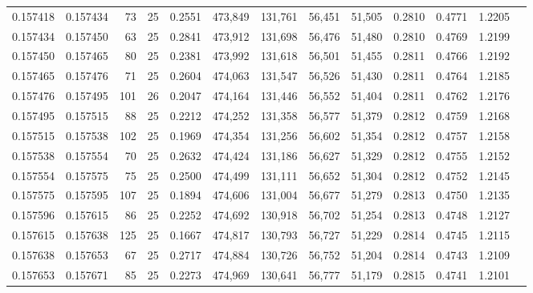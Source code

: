 \begin{tabular}{rrrrrrrrrrrrr}
0.157418 & 0.157434 &    73 &  25 &                                     0.2551 & 473,849 & 131,761 &  56,451 &  51,505 & 0.2810 & 0.4771 & 1.2205 \\
0.157434 & 0.157450 &    63 &  25 &                                     0.2841 & 473,912 & 131,698 &  56,476 &  51,480 & 0.2810 & 0.4769 & 1.2199 \\
0.157450 & 0.157465 &    80 &  25 &                                     0.2381 & 473,992 & 131,618 &  56,501 &  51,455 & 0.2811 & 0.4766 & 1.2192 \\
0.157465 & 0.157476 &    71 &  25 &                                     0.2604 & 474,063 & 131,547 &  56,526 &  51,430 & 0.2811 & 0.4764 & 1.2185 \\
0.157476 & 0.157495 &   101 &  26 &                                     0.2047 & 474,164 & 131,446 &  56,552 &  51,404 & 0.2811 & 0.4762 & 1.2176 \\
0.157495 & 0.157515 &    88 &  25 &                                     0.2212 & 474,252 & 131,358 &  56,577 &  51,379 & 0.2812 & 0.4759 & 1.2168 \\
0.157515 & 0.157538 &   102 &  25 &                                     0.1969 & 474,354 & 131,256 &  56,602 &  51,354 & 0.2812 & 0.4757 & 1.2158 \\
0.157538 & 0.157554 &    70 &  25 &                                     0.2632 & 474,424 & 131,186 &  56,627 &  51,329 & 0.2812 & 0.4755 & 1.2152 \\
0.157554 & 0.157575 &    75 &  25 &                                     0.2500 & 474,499 & 131,111 &  56,652 &  51,304 & 0.2812 & 0.4752 & 1.2145 \\
0.157575 & 0.157595 &   107 &  25 &                                     0.1894 & 474,606 & 131,004 &  56,677 &  51,279 & 0.2813 & 0.4750 & 1.2135 \\
0.157596 & 0.157615 &    86 &  25 &                                     0.2252 & 474,692 & 130,918 &  56,702 &  51,254 & 0.2813 & 0.4748 & 1.2127 \\
0.157615 & 0.157638 &   125 &  25 &                                     0.1667 & 474,817 & 130,793 &  56,727 &  51,229 & 0.2814 & 0.4745 & 1.2115 \\
0.157638 & 0.157653 &    67 &  25 &                                     0.2717 & 474,884 & 130,726 &  56,752 &  51,204 & 0.2814 & 0.4743 & 1.2109 \\
0.157653 & 0.157671 &    85 &  25 &                                     0.2273 & 474,969 & 130,641 &  56,777 &  51,179 & 0.2815 & 0.4741 & 1.2101 \\

\end{tabular}
